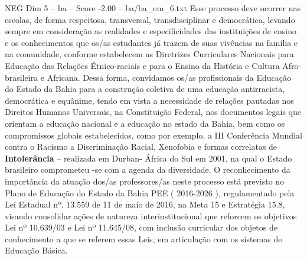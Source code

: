 \begin{textsample}{NEG Dim 5 – ba – Score -2.00 – ba/ba\_em\_6.txt}
Esse processo deve ocorrer nas escolas, de forma respeitosa, transversal, transdisciplinar e democrática, levando sempre em consideração as realidades e especificidades das instituições de ensino e os conhecimentos que os/as estudantes já trazem de suas vivências na família e na comunidade, conforme estabelecem as Diretrizes Curriculares Nacionais para Educação das Relações Étnico-raciais e para o Ensino da História e Cultura Afro-brasileira e Africana.
Dessa forma, convidamos os/as profissionais da Educação do Estado da Bahia para a construção coletiva de uma educação antirracista, democrática e equânime, tendo em vista a necessidade de relações pautadas nos Direitos Humanos Universais, na Constituição Federal, nos documentos legais que orientam a educação nacional e a educação no estado da Bahia, bem como os compromissos globais estabelecidos, como por exemplo, a III Conferência Mundial contra o Racismo a Discriminação Racial, Xenofobia e formas correlatas de \textbf{Intolerância} – realizada em Durban- África do Sul em 2001, na qual o Estado brasileiro comprometeu -se com a agenda da diversidade.
O reconhecimento da importância da atuação dos/as professores/as neste processo está previsto no Plano de Educação do Estado da Bahia PEE ( 2016-2026 ), regulamentado pela Lei Estadual nº. 13.559 de 11 de maio de 2016, na Meta 15 e Estratégia 15.8, visando consolidar ações de natureza interinstitucional que reforcem os objetivos Lei nº 10.639/03 e Lei nº 11.645/08, com inclusão curricular dos objetos de conhecimento a que se referem essas Leis, em articulação com os sistemas de Educação Básica.

\end{textsample}

